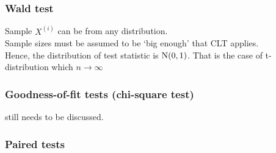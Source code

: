 \documentclass[12pt,a4paper]{article}
\begin{document}
\subsubsection*{Wald test}
Sample $X^{(i)}$ can be from any distribution.\\
Sample sizes must be assumed to be `big enough' that CLT applies.\\
Hence, the distribution of test statistic is $\rm N(0,1)$. That is the case of t-distribution which $n \rightarrow \infty$
\subsubsection*{Goodness-of-fit tests (chi-square test)}
still needs to be discussed.
\subsubsection*{Paired tests}
\end{document}
